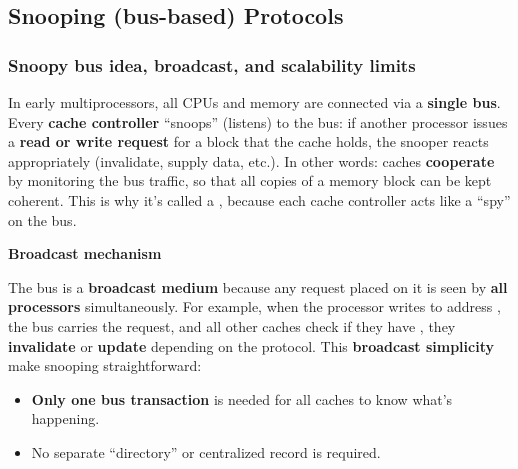 \subsection{Snooping (bus-based) Protocols}

\subsubsection{Snoopy bus idea, broadcast, and scalability limits}

In early multiprocessors, all CPUs and memory are connected via a \textbf{single bus}. Every \textbf{cache controller} ``snoops'' (listens) to the bus: if another processor issues a \textbf{read or write request} for a block that the cache holds, the snooper reacts appropriately (invalidate, supply data, etc.). In other words: caches \textbf{cooperate} by monitoring the bus traffic, so that all copies of a memory block can be kept coherent. This is why it's called a , because each cache controller acts like a ``spy'' on the bus.

\highspace
\begin{flushleft}
    \textcolor{Green3}{ \textbf{Broadcast mechanism}}
\end{flushleft}
The bus is a \textbf{broadcast medium} because any request placed on it is seen by \textbf{all processors} simultaneously. For example, when the processor  writes to address , the bus carries the request, and all other caches check if they have , they \textbf{invalidate} or \textbf{update} depending on the protocol. This \textbf{broadcast simplicity} make snooping straightforward:
\begin{itemize}
    \item \textbf{Only one bus transaction} is needed for all caches to know what's happening.
    \item No separate ``directory'' or centralized record is required.
\end{itemize}

